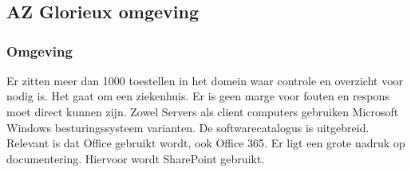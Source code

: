 \chapter{}
\label{ch:stand-van-zaken}



%
%
%

\section{AZ Glorieux omgeving}

\subsection{Omgeving}

Er zitten meer dan 1000 toestellen in het domein waar controle en overzicht voor nodig is. Het gaat om een ziekenhuis. Er is geen marge voor fouten en respons moet direct kunnen zijn.
Zowel Servers als client computers gebruiken Microsoft Windows besturingssysteem varianten. De softwarecatalogus is uitgebreid. Relevant is dat Office gebruikt wordt, ook Office 365.
Er ligt een grote nadruk op documentering. Hiervoor wordt SharePoint gebruikt.

